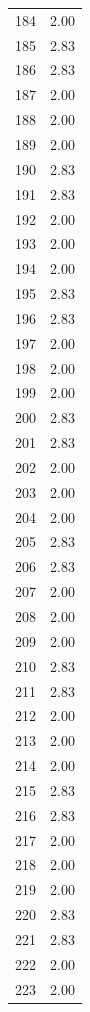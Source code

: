 \documentclass[a4paper,11pt]{article}
\begin{document}
\begin{center}
\begin{longtable}{|R{1.5cm}|R{2.5cm}|}
  184  &         2.00 \\ 
  185  &         2.83 \\ 
  186  &         2.83 \\ 
  187  &         2.00 \\ 
  188  &         2.00 \\ 
  189  &         2.00 \\ 
  190  &         2.83 \\ 
  191  &         2.83 \\ 
  192  &         2.00 \\ 
  193  &         2.00 \\ 
  194  &         2.00 \\ 
  195  &         2.83 \\ 
  196  &         2.83 \\ 
  197  &         2.00 \\ 
  198  &         2.00 \\ 
  199  &         2.00 \\ 
  200  &         2.83 \\ 
  201  &         2.83 \\ 
  202  &         2.00 \\ 
  203  &         2.00 \\ 
  204  &         2.00 \\ 
  205  &         2.83 \\ 
  206  &         2.83 \\ 
  207  &         2.00 \\ 
  208  &         2.00 \\ 
  209  &         2.00 \\ 
  210  &         2.83 \\ 
  211  &         2.83 \\ 
  212  &         2.00 \\ 
  213  &         2.00 \\ 
  214  &         2.00 \\ 
  215  &         2.83 \\ 
  216  &         2.83 \\ 
  217  &         2.00 \\ 
  218  &         2.00 \\ 
  219  &         2.00 \\ 
  220  &         2.83 \\ 
  221  &         2.83 \\ 
  222  &         2.00 \\ 
  223  &         2.00 \\ 

\end{longtable}
\end{center}
\end{document}
